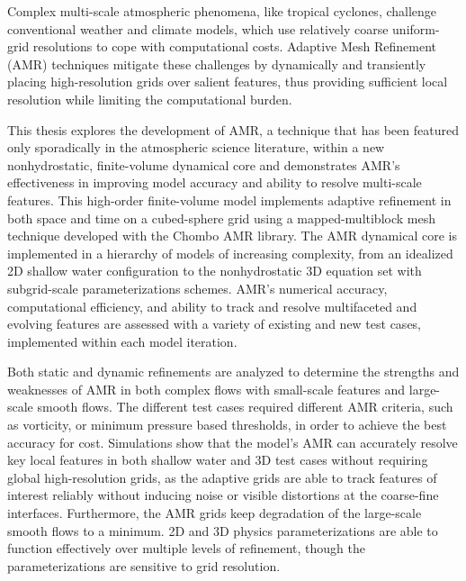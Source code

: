 Complex multi-scale atmospheric phenomena, like tropical 
cyclones, challenge conventional weather and climate models, 
which use relatively coarse uniform-grid resolutions to cope with 
computational costs. Adaptive Mesh Refinement (AMR) techniques 
mitigate these challenges by dynamically and transiently placing high-resolution grids 
over salient features, thus providing sufficient local resolution while 
limiting the computational burden. 

This thesis explores the development of AMR, a technique that 
has been featured only sporadically in the atmospheric science 
literature, within a new nonhydrostatic, 
finite-volume dynamical core and demonstrates AMR's effectiveness in 
improving model accuracy and ability to resolve multi-scale features. 
This high-order finite-volume model implements adaptive refinement in both space and 
time on a cubed-sphere grid using a mapped-multiblock mesh technique developed with
the Chombo AMR library. The AMR dynamical core is implemented in a hierarchy of
models of increasing complexity, from an idealized 2D shallow water configuration 
to the nonhydrostatic 3D equation set with subgrid-scale parameterizations schemes. 
AMR's numerical accuracy, computational efficiency, and ability to track and resolve
multifaceted and evolving features are assessed with
a variety of existing and new test cases, implemented within each model iteration.

Both static and dynamic refinements are analyzed to 
determine the strengths and weaknesses of AMR in both 
complex flows with small-scale features and large-scale smooth flows.
The different test cases required different AMR criteria, such 
as vorticity, or minimum pressure based thresholds, 
in order to achieve the best accuracy for cost. Simulations show 
that the model's AMR can accurately resolve key local features in 
both shallow water and 3D test cases without 
requiring global high-resolution grids, as the adaptive grids are able 
to track features of interest reliably without inducing noise or visible 
distortions at the coarse-fine interfaces. Furthermore, the AMR grids 
keep degradation of the large-scale smooth flows to a minimum.
2D and 3D physics parameterizations are able to 
function effectively over multiple levels of refinement, though
the parameterizations are sensitive to grid resolution.

